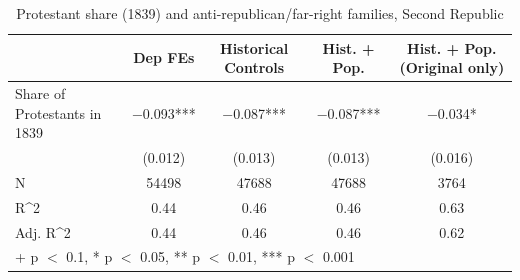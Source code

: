 \begin{table}
\centering
\caption{Protestant share (1839) and anti-republican/far-right families, Second Republic}
\centering
\begin{tabular}[t]{lcccc}
\toprule
  & Dep FEs & Historical Controls & Hist. + Pop. & Hist. + Pop. (Original only)\\
\midrule
Share of Protestants in 1839 & \num{-0.093}*** & \num{-0.087}*** & \num{-0.087}*** & \num{-0.034}*\\
 & (\num{0.012}) & (\num{0.013}) & (\num{0.013}) & (\num{0.016})\\
\midrule
N & \num{54498} & \num{47688} & \num{47688} & \num{3764}\\
R\textasciicircum{}2 & \num{0.44} & \num{0.46} & \num{0.46} & \num{0.63}\\
Adj. R\textasciicircum{}2 & \num{0.44} & \num{0.46} & \num{0.46} & \num{0.62}\\
\bottomrule
\multicolumn{5}{l}{\rule{0pt}{1em}+ p $<$ 0.1, * p $<$ 0.05, ** p $<$ 0.01, *** p $<$ 0.001}\\
\end{tabular}
\end{table}
